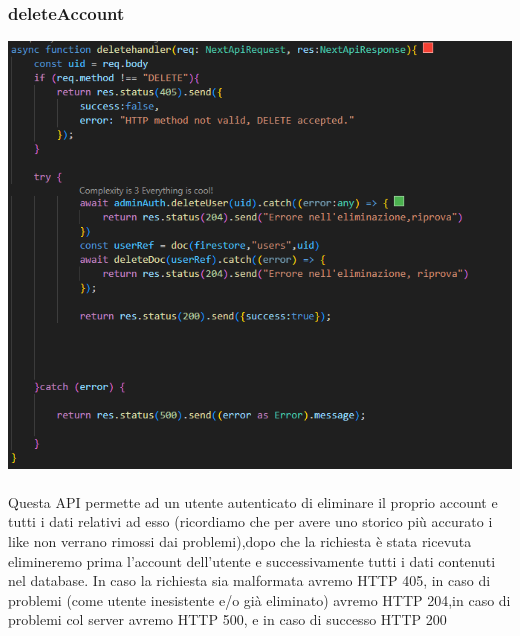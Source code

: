 \documentclass[11pt, a4paper]{article}
\theoremstyle{definition}
\begin{document}
\subsubsection{deleteAccount}
\includegraphics[width=\textwidth]{materiale/API/deleteAccount.png}
\\\\
Questa API permette ad un utente autenticato di eliminare il proprio account e tutti i dati relativi ad esso (ricordiamo che per avere uno storico più accurato i like non verrano rimossi dai problemi),dopo che la richiesta
è stata ricevuta elimineremo prima l'account dell'utente e successivamente tutti i dati contenuti nel database.
In caso la richiesta sia malformata avremo HTTP 405, in caso di problemi (come utente inesistente e/o già eliminato) avremo HTTP 204,in caso di problemi col server avremo HTTP 500, e in caso di successo HTTP 200
\end{document}
